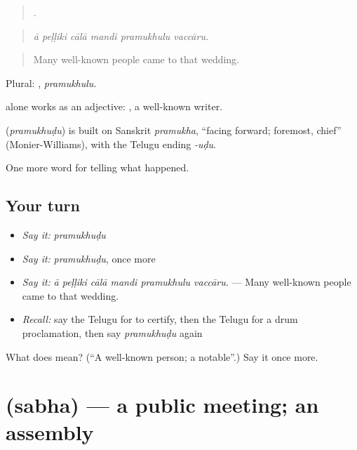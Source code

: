 \begin{quote}
     .
\end{quote}

\begin{quote}
\emph{ā peḷḷiki cālā mandi pramukhulu vaccāru.}
\end{quote}

\begin{quote}
Many well-known people came to that wedding.
\end{quote}

Plural: , \emph{pramukhulu}.

 alone works as an adjective:  , a well-known writer.

\begin{cousinweb}
\textbf{} (\emph{pramukhuḍu}) is built on Sanskrit \emph{pramukha}, \textquotedblleft{}facing forward; foremost, chief\textquotedblright{} (Monier-Williams), with the Telugu ending \emph{-uḍu}.
\end{cousinweb}

\begin{grammarlens}[title={What you've built}]
One more word for telling what happened.
\end{grammarlens}

\subsection*{Your turn}
\begin{itemize}
\raggedright
  \item \emph{Say it:} \emph{pramukhuḍu}
  \item \emph{Say it:} \emph{pramukhuḍu}, once more
  \item \emph{Say it:} \emph{ā peḷḷiki cālā mandi pramukhulu vaccāru.} — Many well-known people came to that wedding.
  \item \emph{Recall:} say the Telugu for to certify, then the Telugu for a drum proclamation, then say \emph{pramukhuḍu} again
\end{itemize}

\begin{tcolorbox}[breakable,colback=teal!4,colframe=teal!35!black,title={Before you move on}]
What does  mean? (\textquotedblleft{}A well-known person; a notable\textquotedblright{}.) Say it once more.
\end{tcolorbox}
\section[\texorpdfstring{\te{సభ} (sabha)}{సభ (sabha)}]{ (sabha) — a public meeting; an assembly}


